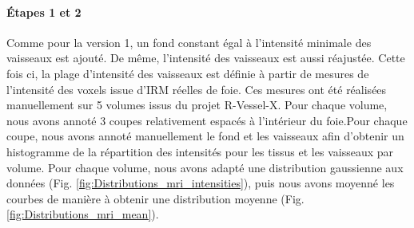 \paragraph{Étapes 1 et 2}
Comme pour la version 1, un fond constant égal à l'intensité minimale des vaisseaux est ajouté. De même, l'intensité des vaisseaux est aussi réajustée. Cette fois ci, la plage d'intensité des vaisseaux est définie à partir de mesures de l'intensité des voxels issue d'IRM réelles de foie. Ces mesures ont été réalisées manuellement sur 5 volumes issus du projet R-Vessel-X. Pour chaque volume, nous avons annoté 3 coupes relativement espacés à l'intérieur du foie.Pour chaque coupe, nous avons annoté manuellement le fond et les vaisseaux afin d'obtenir un histogramme de la répartition des intensités pour les tissus et les vaisseaux par volume. Pour chaque volume, nous avons adapté une distribution gaussienne aux données (Fig. \ref{fig:Distributions_mri_intensities}),  puis nous avons moyenné les courbes de manière à obtenir une distribution moyenne (Fig. \ref{fig:Distributions_mri_mean}).

